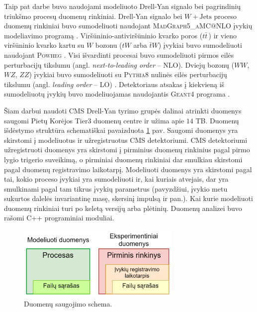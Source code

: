 \documentclass[a4paper, 12pt, oneside]{article}
\newcommand{\WJets}{W\! +\!\mathrm{Jets}}
\begin{document}
Taip pat darbe buvo naudojami modeliuoto Drell-Yan signalo bei pagrindinių triukšmo procesų duomenų rinkiniai.
Drell-Yan signalo bei $\WJets$ proceso duomenų rinkiniai buvo sumodeliuoti naudojant
\textsc{MadGraph5\_aMC@NLO} įvykių modeliavimo programą \cite{MG_aMCatNLO}.
Viršūninio-antiviršūninio kvarko poros ($t\bar{t}\,$) ir vieno viršūninio kvarko kartu su $W$ bozonu ($tW$ arba
$\bar{t}W$) įvykiai buvo sumodeliuoti naudojant \textsc{Powheg} \cite{powheg_ttbar, powheg_tW}.
Visi išvardinti procesai buvo sumodeliuoti pirmos eilės perturbacijų tikslumu (angl. \textit{next-to-leading order} -- NLO).
Dviejų bozonų ($WW$, $WZ$, $ZZ$) įvykiai buvo sumodeliuoti su \textsc{Pythia8} nulinės eilės perturbacijų tikslumu
(angl. \textit{leading order} -- LO) \cite{pythia82}.
Detektoriaus atsakas į kiekvieną iš sumodeliuotų įvykių buvo modeliuojamas naudojantis \textsc{Geant4} programa
\cite{geant4}.

Šiam darbui naudoti CMS Drell-Yan tyrimo grupės dalinai atrinkti duomenys saugomi Pietų Korėjos Tier3 duomenų centre ir užima apie $14$ TB.
Duomenų išdėstymo struktūra schematiškai pavaizduota \ref{fig:duomSchem} pav.
Saugomi duomenys yra skirstomi į modeliuotus ir užregistruotus CMS detektoriumi.
CMS detektoriumi užregistruoti duomenys yra skirstomi į pirminius duomenų rinkinius pagal pirmo lygio trigerio
suveikimą, o pirminiai duomenų rinkiniai dar smulkiau skirstomi pagal duomenų registravimo laikotarpį.
Modeliuoti duomenys yra skirstomi pagal tai, kokio proceso įvykiai yra sumodeliuoti ir, kai kuriais atvejais,
dar yra smulkinami pagal tam tikrus įvykių parametrus (pavyzdžiui, įvykio metu sukurtos dalelės invariantinę masę,
skersinį impulsą ir pan.).
Kai kurie modeliuoti duomenų rinkiniai turi po keletą versijų arba plėtinių.
Duomenų analizei buvo rašomi C++ programiniai moduliai.

\begin{figure}[H]
	\includegraphics[width=0.7\textwidth]{Duomenu_schema_DataMC_v2.png}
	\caption{\label{fig:duomSchem} Duomenų saugojimo schema.}
\end{figure}
\end{document}
